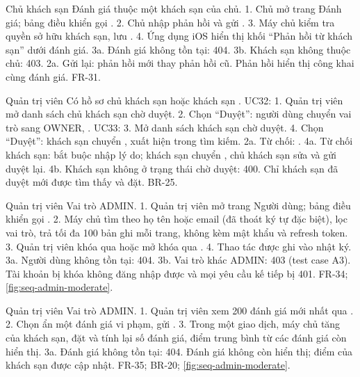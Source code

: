 {Chủ khách sạn}
{Đánh giá thuộc một khách sạn của chủ.}
{1. Chủ mở trang Đánh giá; bảng điều khiển gọi . 2. Chủ nhập phản hồi và gửi . 3. Máy chủ kiểm tra quyền sở hữu khách sạn, lưu . 4. Ứng dụng iOS hiển thị khối ``Phản hồi từ khách sạn'' dưới đánh giá.}
{3a. Đánh giá không tồn tại: 404. 3b. Khách sạn không thuộc chủ: 403. 2a. Gửi lại: phản hồi mới thay phản hồi cũ.}
{Phản hồi hiển thị công khai cùng đánh giá.}
{FR-31.}

{Quản trị viên}
{Có hồ sơ chủ khách sạn  hoặc khách sạn .}
{UC32: 1. Quản trị viên mở danh sách chủ khách sạn chờ duyệt. 2. Chọn ``Duyệt'': người dùng chuyển vai trò sang OWNER, . UC33: 3. Mở danh sách khách sạn chờ duyệt. 4. Chọn ``Duyệt'': khách sạn chuyển , xuất hiện trong tìm kiếm.}
{2a. Từ chối: . 4a. Từ chối khách sạn: bắt buộc nhập lý do; khách sạn chuyển , chủ khách sạn sửa và gửi duyệt lại. 4b. Khách sạn không ở trạng thái chờ duyệt: 400.}
{Chỉ khách sạn đã duyệt mới được tìm thấy và đặt.}
{BR-25.}

{Quản trị viên}
{Vai trò ADMIN.}
{1. Quản trị viên mở trang Người dùng; bảng điều khiển gọi . 2. Máy chủ tìm theo họ tên hoặc email (đã thoát ký tự đặc biệt), lọc vai trò, trả tối đa 100 bản ghi mỗi trang, không kèm mật khẩu và refresh token. 3. Quản trị viên khóa qua  hoặc mở khóa qua . 4. Thao tác được ghi vào nhật ký.}
{3a. Người dùng không tồn tại: 404. 3b. Vai trò khác ADMIN: 403 (test case A3).}
{Tài khoản bị khóa không đăng nhập được và mọi yêu cầu kế tiếp bị 401.}
{FR-34; \cref{fig:seq-admin-moderate}.}

{Quản trị viên}
{Vai trò ADMIN.}
{1. Quản trị viên xem 200 đánh giá mới nhất qua . 2. Chọn ẩn một đánh giá vi phạm, gửi . 3. Trong một giao dịch, máy chủ tăng  của khách sạn, đặt  và tính lại số đánh giá, điểm trung bình từ các đánh giá còn hiển thị.}
{3a. Đánh giá không tồn tại: 404.}
{Đánh giá không còn hiển thị; điểm của khách sạn được cập nhật.}
{FR-35; BR-20; \cref{fig:seq-admin-moderate}.}

